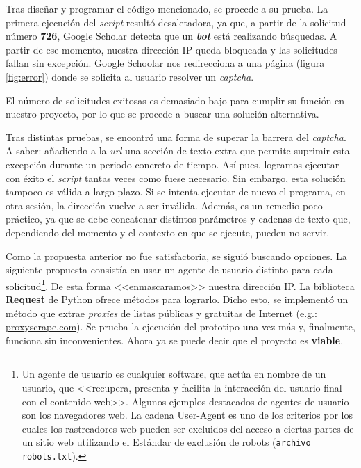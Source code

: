 
Tras diseñar y programar el código mencionado, se procede a su prueba. La primera ejecución del \textit{script} resultó desaletadora, ya que, a partir de la solicitud número \textbf{726}, Google Scholar detecta que un \textbf{\textit{bot}} está realizando búsquedas. A partir de ese momento, nuestra dirección IP queda bloqueada y las solicitudes fallan sin excepción. Google Schoolar nos redirecciona a una página (figura \ref{fig:error}) donde se solicita al usuario resolver un \textit{captcha}. 


El número de solicitudes exitosas es demasiado bajo para cumplir su función en nuestro proyecto, por lo que se procede a buscar una solución alternativa. 

Tras distintas pruebas, se encontró una forma de superar la barrera del \textit{captcha}. A saber: añadiendo a la \textit{url} una sección de texto extra que permite suprimir esta excepción durante un periodo concreto de tiempo. Así pues, logramos ejecutar con éxito el \textit{script} tantas veces como fuese necesario. Sin embargo, esta solución tampoco es válida a largo plazo. Si se intenta ejecutar de nuevo el programa, en otra sesión, la dirección vuelve a ser inválida. Además, es un remedio poco práctico, ya que se debe concatenar distintos parámetros y cadenas de texto que, dependiendo del momento y el contexto en que se ejecute, pueden no servir.

Como la propuesta anterior no fue satisfactoria, se siguió buscando opciones. La siguiente propuesta consistía en usar un agente de usuario distinto para cada solicitud\footnote{Un agente de usuario es cualquier software, que actúa en nombre de un usuario, que <<recupera, presenta y facilita la interacción del usuario final con el contenido web>>. Algunos ejemplos destacados de agentes de usuario son los navegadores web. La cadena User-Agent es uno de los criterios por los cuales los rastreadores web pueden ser excluidos del acceso a ciertas partes de un sitio web utilizando el Estándar de exclusión de robots (\texttt{archivo robots.txt}).}. De esta forma <<enmascaramos>> nuestra dirección IP. La biblioteca \textbf{Request} de Python ofrece métodos para lograrlo. Dicho esto, se implementó un método que extrae \textit{proxies} de listas públicas y gratuitas de Internet (e.g.: \href{https://www.proxyscrape.com/free-proxy-list}{proxyscrape.com}). Se prueba la ejecución del prototipo una vez más y, finalmente, funciona sin inconvenientes. Ahora ya se puede decir que el proyecto es \textbf{viable}.


